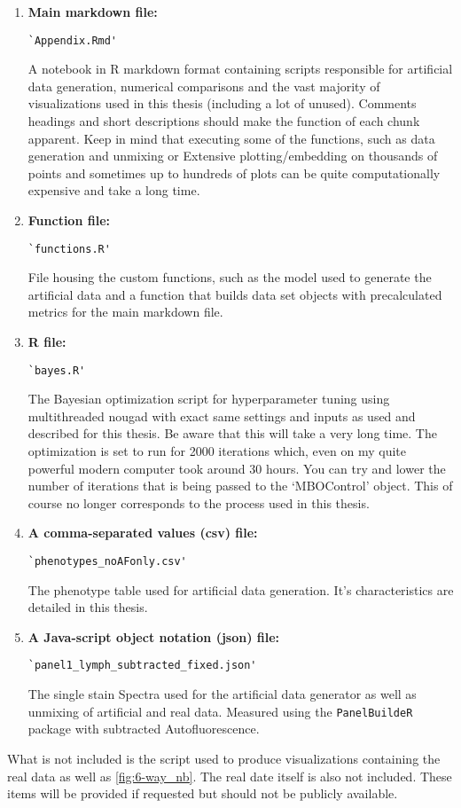 \begin{enumerate}
    \item \textbf{Main markdown file:} \begin{verbatim}`Appendix.Rmd'\end{verbatim}
    
    A notebook in R markdown format containing scripts responsible for artificial data generation, numerical comparisons and the vast majority of visualizations used in this thesis (including a lot of unused). Comments headings and short descriptions should make the function of each chunk apparent. Keep in mind that executing some of the functions, such as data generation and unmixing or Extensive plotting/embedding on thousands of points and sometimes up to hundreds of plots can be quite computationally expensive and take a long time. 
    
    \item \textbf{Function file:} \begin{verbatim}`functions.R'\end{verbatim}
    
    File housing the custom functions, such as the model used to generate the artificial data and a function that builds data set objects with precalculated metrics for the main markdown file.
    
    \item \textbf{R file:} \begin{verbatim}`bayes.R'\end{verbatim}
    
    The Bayesian optimization script for hyperparameter tuning using multithreaded nougad with exact same settings and inputs as used and described for this thesis. Be aware that this will take a very long time. The optimization is set to run for 2000 iterations which, even on my quite powerful modern computer took around 30 hours. You can try and lower the number of iterations that is being passed to the `MBOControl' object. This of course no longer corresponds to the process used in this thesis.
    
    \item \textbf{A comma-separated values (csv) file:} \begin{verbatim}`phenotypes_noAFonly.csv'\end{verbatim}
    
    The phenotype table used for artificial data generation. It's characteristics are detailed in this thesis.
    
    \item \textbf{A Java-script object notation (json) file:} \begin{verbatim}`panel1_lymph_subtracted_fixed.json'\end{verbatim}
    
    The single stain Spectra used for the artificial data generator as well as unmixing of artificial and real data. Measured using the \texttt{PanelBuildeR} package with subtracted Autofluorescence.
    
\end{enumerate}

What is not included is the script used to produce visualizations containing the real data as well as \cref{fig:6-way_nb}. The real date itself is also not included. These items will be provided if requested but should not be publicly available.